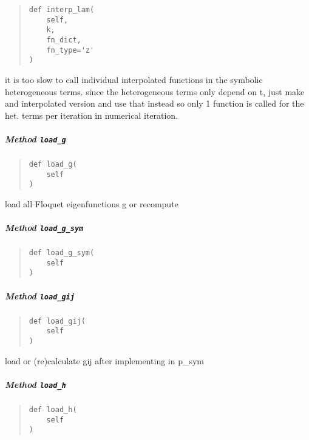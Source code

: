\documentclass[english,a4paper,oneside]{article}
\let\oldsubparagraph\subparagraph
\renewcommand{\subparagraph}[1]{\oldsubparagraph{#1}\mbox{}}
\begin{document}
\begin{quote}
\begin{verbatim}
def interp_lam(
    self,
    k,
    fn_dict,
    fn_type='z'
)
\end{verbatim}
\end{quote}

it is too slow to call individual interpolated functions in the symbolic
heterogeneous terms. since the heterogeneous terms only depend on t,
just make and interpolated version and use that instead so only 1
function is called for the het. terms per iteration in numerical
iteration.

\hypertarget{nBodyCoupling.nBodyCoupling.load_g}{%
\subparagraph{\texorpdfstring{Method
\texttt{load\_g}}{Method load\_g}}\label{nBodyCoupling.nBodyCoupling.load_g}}

\begin{quote}
\begin{verbatim}
def load_g(
    self
)
\end{verbatim}
\end{quote}

load all Floquet eigenfunctions g or recompute

\hypertarget{nBodyCoupling.nBodyCoupling.load_g_sym}{%
\subparagraph{\texorpdfstring{Method
\texttt{load\_g\_sym}}{Method load\_g\_sym}}\label{nBodyCoupling.nBodyCoupling.load_g_sym}}

\begin{quote}
\begin{verbatim}
def load_g_sym(
    self
)
\end{verbatim}
\end{quote}

\hypertarget{nBodyCoupling.nBodyCoupling.load_gij}{%
\subparagraph{\texorpdfstring{Method
\texttt{load\_gij}}{Method load\_gij}}\label{nBodyCoupling.nBodyCoupling.load_gij}}

\begin{quote}
\begin{verbatim}
def load_gij(
    self
)
\end{verbatim}
\end{quote}

load or (re)calculate gij after implementing in p\_sym

\hypertarget{nBodyCoupling.nBodyCoupling.load_h}{%
\subparagraph{\texorpdfstring{Method
\texttt{load\_h}}{Method load\_h}}\label{nBodyCoupling.nBodyCoupling.load_h}}

\begin{quote}
\begin{verbatim}
def load_h(
    self
)
\end{verbatim}
\end{quote}
\end{document}
